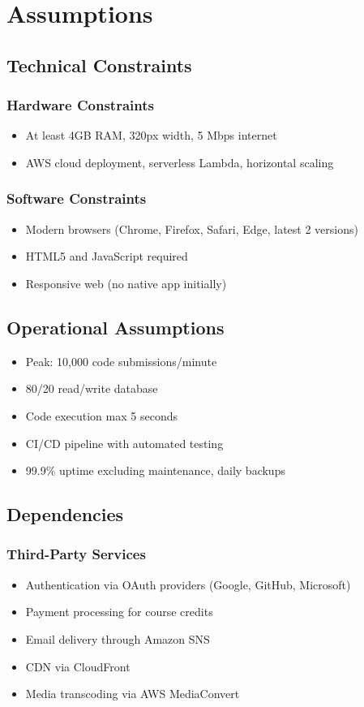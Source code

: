 \documentclass[a4paper, 11pt]{scrreprt}
\begin{document}
\chapter{Assumptions}

\section{Technical Constraints}
\subsection{Hardware Constraints}
\begin{itemize}
    \item At least 4GB RAM, 320px width, 5 Mbps internet
    \item AWS cloud deployment, serverless Lambda, horizontal scaling
\end{itemize}

\subsection{Software Constraints}
\begin{itemize}
    \item Modern browsers (Chrome, Firefox, Safari, Edge, latest 2 versions)
    \item HTML5 and JavaScript required
    \item Responsive web (no native app initially)
\end{itemize}

\section{Operational Assumptions}
\begin{itemize}
    \item Peak: 10,000 code submissions/minute
    \item 80/20 read/write database
    \item Code execution max 5 seconds
    \item CI/CD pipeline with automated testing
    \item 99.9\% uptime excluding maintenance, daily backups
\end{itemize}

\section{Dependencies}
\subsection{Third-Party Services}
\begin{itemize}
    \item Authentication via OAuth providers (Google, GitHub, Microsoft)
    \item Payment processing for course credits
    \item Email delivery through Amazon SNS
    \item CDN via CloudFront
    \item Media transcoding via AWS MediaConvert
\end{itemize}
\end{document}
